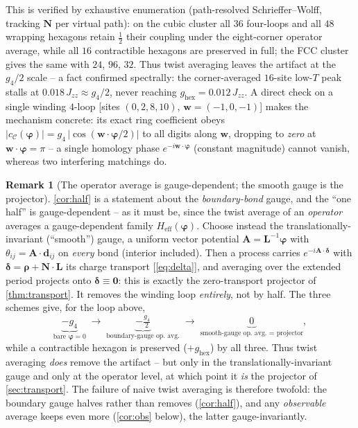 \documentclass[11pt,letterpaper]{article}
\newcommand{\Jzz}{J_{zz}}
\newcommand{\bvarphi}{\bm{\varphi}}
\newcommand{\bw}{\mathbf{w}}
\newcommand{\bN}{\mathbf{N}}
\newcommand{\bL}{\mathbf{L}}
\newcommand{\brho}{\bm{\rho}}
\newcommand{\bdelta}{\bm{\delta}}
\newcommand{\Heff}{H_{\mathrm{eff}}}
\newcommand{\gfour}{g_{4}}
\newcommand{\ghex}{g_{\mathrm{hex}}}
\theoremstyle{plain}
\theoremstyle{definition}
\newtheorem{remark}{Remark}
\begin{document}
This is verified by exhaustive enumeration (path-resolved
Schrieffer--Wolff, tracking $\bN$ per virtual path): on the cubic cluster
all $36$ four-loops and all $48$ wrapping hexagons retain $\tfrac12$
their coupling under the eight-corner operator average, while all $16$
contractible hexagons are preserved in full; the FCC cluster gives the
same with $24$, $96$, $32$. Thus twist averaging leaves the artifact at
the $\gfour/2$ scale -- a fact confirmed spectrally: the corner-averaged
$16$-site low-$T$ peak stalls at $0.018\,\Jzz\approx\gfour/2$, never
reaching $\ghex=0.012\,\Jzz$. A direct check on a single winding
$4$-loop [sites $(0,2,8,10)$, $\bw=(-1,0,-1)$] makes the mechanism
concrete: its exact ring coefficient obeys
$|c_{\mathcal C}(\bvarphi)|=\gfour\,|\cos(\bw\cdot\bvarphi/2)|$ to all
digits along $\bw$, dropping to \emph{zero} at $\bw\cdot\bvarphi=\pi$ --
a single homology phase $e^{-i\bw\cdot\bvarphi}$ (constant magnitude)
cannot vanish, whereas two interfering matchings do.

\begin{remark}[The operator average is gauge-dependent; the smooth gauge
is the projector]
\label{rem:gauge}
\cref{cor:half} is a statement about the \emph{boundary-bond} gauge, and
the ``one half'' is gauge-dependent -- as it must be, since the twist
average of an \emph{operator} averages a gauge-dependent family
$\Heff(\bvarphi)$. Choose instead the translationally-invariant
(``smooth'') gauge, a uniform vector potential $\mathbf A=\bL^{-1}\bvarphi$
with $\theta_{ij}=\mathbf A\cdot\mathbf d_{ij}$ on \emph{every} bond
(interior included). Then a process carries $e^{-i\mathbf A\cdot\bdelta}$
with $\bdelta=\brho+\bN\cdot\bL$ its charge transport
[\cref{eq:delta}], and averaging over the extended period projects onto
$\bdelta\equiv\bm0$: this is exactly the zero-transport projector of
\cref{thm:transport}. It removes the winding loop \emph{entirely}, not by
half. The three schemes give, for the loop above,
\begin{equation}
\underbrace{-\gfour}_{\text{bare }\bvarphi=0}
\;\longrightarrow\;
\underbrace{-\tfrac{\gfour}{2}}_{\text{boundary-gauge op.\ avg.}}
\;\longrightarrow\;
\underbrace{\;0\;}_{\text{smooth-gauge op.\ avg.\ }=\text{ projector}},
\end{equation}
while a contractible hexagon is preserved ($+\ghex$) by all three. Thus
twist averaging \emph{does} remove the artifact -- but only in the
translationally-invariant gauge and only at the operator level, at which
point it \emph{is} the projector of \cref{sec:transport}. The failure of
naive twist averaging is therefore twofold: the boundary gauge halves
rather than removes (\cref{cor:half}), and any \emph{observable} average
keeps even more (\cref{cor:obs} below), the latter gauge-invariantly.
\end{remark}
\end{document}
